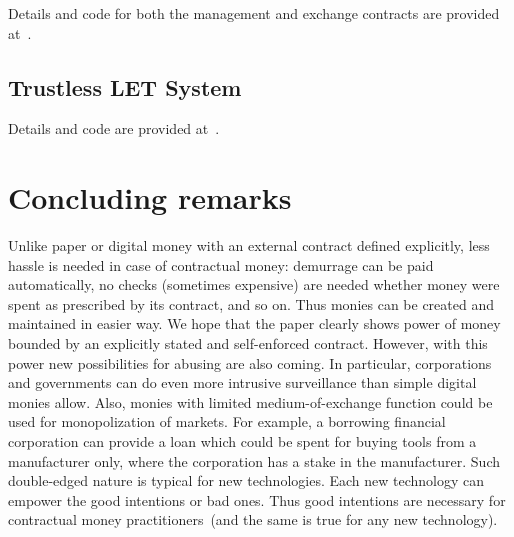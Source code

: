 \documentclass[]{llncs}   %
\newcommand{\authnote}[2]{\marginpar{\parbox{\marginparwidth}{\tiny %
  \textsf{#1 {\textcolor{blue}{notes: #2}}}}}%
  \textcolor{blue}{\textbf{\dag}}}
\newcommand{\authnote}[2]{
  \textsf{#1\textcolor{blue}{ #2}}}
\newcommand{\authnote}[2]{}
\newcommand{\knote}[1]{{\authnote{\textcolor{green}{Alex notes:}}{#1}}}
\begin{document}
Details and code for both the management and exchange contracts are provided at~\cite{lets-trusted}.


\subsection{Trustless LET System}
\label{sec-trustless}

\knote{Amitabh, please complete this section}


Details and code are provided at~\cite{lets-trustless}.


\section{Concluding remarks}
\label{sec-conslusion}

Unlike paper or digital money with an external contract defined explicitly, less hassle is needed in case of contractual money: demurrage can be paid automatically, no checks (sometimes expensive) are needed whether money were spent as prescribed
by its contract, and so on. Thus monies can be created and maintained in easier way. We hope that the paper clearly shows power of money bounded by an explicitly stated and self-enforced contract. However, with this power new possibilities for abusing are also coming. In particular, corporations and governments can do even more intrusive surveillance than simple digital monies allow.  Also, monies with limited medium-of-exchange function could be used for monopolization of markets. For example, a borrowing financial corporation can provide a loan which could be spent for buying tools from a manufacturer only, where the corporation has a stake in the manufacturer. Such double-edged nature is typical for new technologies. Each new technology can empower the good intentions or bad ones. Thus good intentions are necessary for contractual money practitioners~(and the same is true for any new technology).



\end{document}
